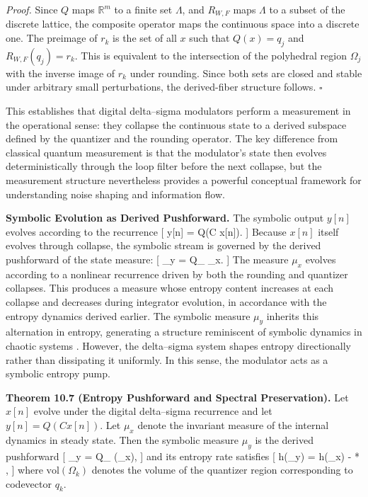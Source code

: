 \textit{Proof.}
Since $Q$ maps $\mathbb{R}^{m}$ to a finite set $\Lambda$, and $R_{W,F}$ maps $\Lambda$ to a subset of the discrete lattice, the composite operator maps the continuous space into a discrete one. The preimage of $r_{k}$ is the set of all $x$ such that $Q(x) = q_{j}$ and $R_{W,F}(q_{j}) = r_{k}$. This is equivalent to the intersection of the polyhedral region $\Omega_{j}$ with the inverse image of $r_{k}$ under rounding. Since both sets are closed and stable under arbitrary small perturbations, the derived-fiber structure follows. \hfill $\square$

\medskip

This establishes that digital delta–sigma modulators perform a measurement in the operational sense: they collapse the continuous state to a derived subspace defined by the quantizer and the rounding operator. The key difference from classical quantum measurement is that the modulator's state then evolves deterministically through the loop filter before the next collapse, but the measurement structure nevertheless provides a powerful conceptual framework for understanding noise shaping and information flow.

\medskip

\textbf{Symbolic Evolution as Derived Pushforward.}
The symbolic output $y[n]$ evolves according to the recurrence
[
y[n] = Q(C x[n]).
]
Because $x[n]$ itself evolves through collapse, the symbolic stream is governed by the derived pushforward of the state measure:
[
\mu_{y} = Q_{\ast} \mu_{x}.
]
The measure $\mu_{x}$ evolves according to a nonlinear recurrence driven by both the rounding and quantizer collapses. This produces a measure whose entropy content increases at each collapse and decreases during integrator evolution, in accordance with the entropy dynamics derived earlier. The symbolic measure $\mu_{y}$ inherits this alternation in entropy, generating a structure reminiscent of symbolic dynamics in chaotic systems \cite{strogatz1994nonlineardynamics}. However, the delta–sigma system shapes entropy directionally rather than dissipating it uniformly. In this sense, the modulator acts as a symbolic entropy pump.

\medskip

\textbf{Theorem 10.7 (Entropy Pushforward and Spectral Preservation).}
Let $x[n]$ evolve under the digital delta–sigma recurrence and let $y[n] = Q(C x[n])$. Let $\mu_{x}$ denote the invariant measure of the internal dynamics in steady state. Then the symbolic measure $\mu_{y}$ is the derived pushforward
[
\mu_{y} = Q_{\ast} (\mu_{x}),
]
and its entropy rate satisfies
[
h(\mu_{y}) = h(\mu_{x}) - *{} ,
]
where $\mathrm{vol}(\Omega_{k})$ denotes the volume of the quantizer region corresponding to codevector $q_{k}$.

